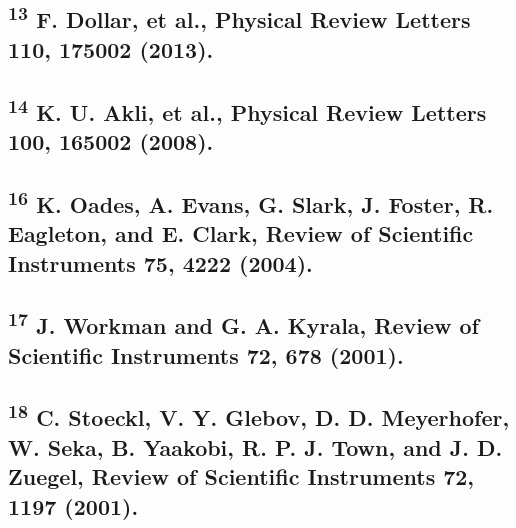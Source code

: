 \subsection{\texorpdfstring{\textsuperscript{13} F. Dollar, et al.,
Physical Review Letters 110, 175002
(2013).}{13 F. Dollar, et al., Physical Review Letters 110, 175002 (2013).}}\label{f.-dollar-et-al.-physical-review-letters-110-175002-2013.}

\subsection{\texorpdfstring{\textsuperscript{14} K. U. Akli, et al.,
Physical Review Letters 100, 165002
(2008).}{14 K. U. Akli, et al., Physical Review Letters 100, 165002 (2008).}}\label{k.-u.-akli-et-al.-physical-review-letters-100-165002-2008.}


\subsection{\texorpdfstring{\textsuperscript{16} K. Oades, A. Evans, G.
Slark, J. Foster, R. Eagleton, and E. Clark, Review of Scientific
Instruments 75, 4222
(2004).}{16 K. Oades, A. Evans, G. Slark, J. Foster, R. Eagleton, and E. Clark, Review of Scientific Instruments 75, 4222 (2004).}}\label{k.-oades-a.-evans-g.-slark-j.-foster-r.-eagleton-and-e.-clark-review-of-scientific-instruments-75-4222-2004.}

\subsection{\texorpdfstring{\textsuperscript{17} J. Workman and G. A.
Kyrala, Review of Scientific Instruments 72, 678
(2001).}{17 J. Workman and G. A. Kyrala, Review of Scientific Instruments 72, 678 (2001).}}\label{j.-workman-and-g.-a.-kyrala-review-of-scientific-instruments-72-678-2001.}

\subsection{\texorpdfstring{\textsuperscript{18} C. Stoeckl, V. Y.
Glebov, D. D. Meyerhofer, W. Seka, B. Yaakobi, R. P. J. Town, and J. D.
Zuegel, Review of Scientific Instruments 72, 1197
(2001).}{18 C. Stoeckl, V. Y. Glebov, D. D. Meyerhofer, W. Seka, B. Yaakobi, R. P. J. Town, and J. D. Zuegel, Review of Scientific Instruments 72, 1197 (2001).}}\label{c.-stoeckl-v.-y.-glebov-d.-d.-meyerhofer-w.-seka-b.-yaakobi-r.-p.-j.-town-and-j.-d.-zuegel-review-of-scientific-instruments-72-1197-2001.}

